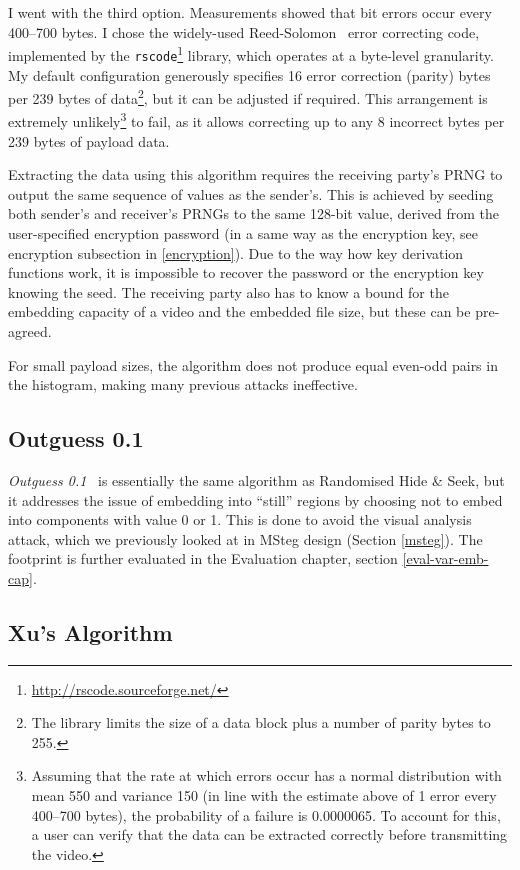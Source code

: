 \documentclass[12pt,british,twoside,notitlepage,usenames,dvipsnames,hypens,final]{report}
\numberwithin{equation}{section}
\numberwithin{figure}{section}
\begin{document}
I went with the third option. Measurements showed that bit errors occur every 400--700 bytes. I chose the widely-used Reed-Solomon~\cite{clarke2002reed} error correcting code, implemented by the \texttt{rscode}\footnote{\url{http://rscode.sourceforge.net/}} library, which operates at a byte-level granularity. My default configuration generously specifies 16 error correction (parity) bytes per 239 bytes of data\footnote{The library limits the size of a data block plus a number of parity bytes to 255.}, but it can be adjusted if required. This arrangement is extremely unlikely\footnote{Assuming that the rate at which errors occur has a normal distribution with mean 550 and variance 150 (in line with the estimate above of 1 error every 400--700 bytes), the probability of a failure is 0.0000065. To account for this, a user can verify that the data can be extracted correctly before transmitting the video.} to fail, as it allows correcting up to any 8 incorrect bytes per 239 bytes of payload data.

Extracting the data using this algorithm requires the receiving party's PRNG to output the same sequence of values as the sender's. This is achieved by seeding both sender's and receiver's PRNGs to the same 128-bit value, derived from the user-specified encryption password (in a same way as the encryption key, see encryption subsection in \ref{encryption}). Due to the way how key derivation functions work, it is impossible to recover the password or the encryption key knowing the seed. The receiving party also has to know a bound for the embedding capacity of a video and the embedded file size, but these can be pre-agreed.

For small payload sizes, the algorithm does not produce equal even-odd pairs in the histogram, making many previous attacks ineffective.

\subsection{Outguess 0.1}

\emph{Outguess 0.1}~\cite{bateman} is essentially the same algorithm as Randomised Hide \& Seek, but it addresses the issue of embedding into ``still'' regions by choosing not to embed into components with value 0 or 1. This is done to avoid the visual analysis attack, which we previously looked at in MSteg design (Section \ref{msteg}). The footprint is further evaluated in the Evaluation chapter, section \ref{eval-var-emb-cap}.

\subsection{Xu's Algorithm}
\label{xu-alg}
\end{document}
